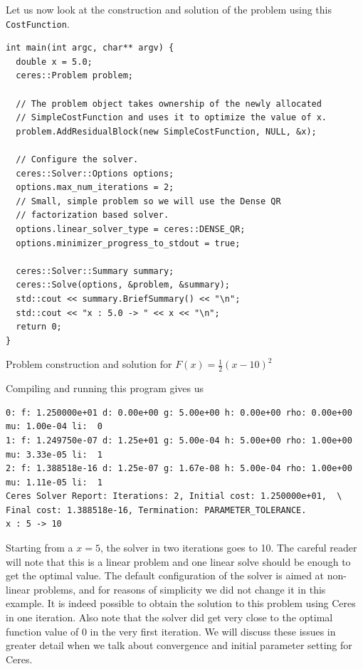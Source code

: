 Let us now look at the construction and solution of the problem using this \texttt{CostFunction}.
\begin{listing}[H]
\begin{verbatim}
int main(int argc, char** argv) {
  double x = 5.0;
  ceres::Problem problem;

  // The problem object takes ownership of the newly allocated
  // SimpleCostFunction and uses it to optimize the value of x.
  problem.AddResidualBlock(new SimpleCostFunction, NULL, &x);

  // Configure the solver.
  ceres::Solver::Options options;
  options.max_num_iterations = 2;
  // Small, simple problem so we will use the Dense QR
  // factorization based solver.
  options.linear_solver_type = ceres::DENSE_QR;
  options.minimizer_progress_to_stdout = true;

  ceres::Solver::Summary summary;
  ceres::Solve(options, &problem, &summary);
  std::cout << summary.BriefSummary() << "\n";
  std::cout << "x : 5.0 -> " << x << "\n";
  return 0;
}
\end{verbatim}
\caption{Problem construction and solution for $F(x) = \frac{1}{2}(x-10)^2$}
\end{listing}

Compiling and running this program gives us
\begin{verbatim}
0: f: 1.250000e+01 d: 0.00e+00 g: 5.00e+00 h: 0.00e+00 rho: 0.00e+00 mu: 1.00e-04 li:  0
1: f: 1.249750e-07 d: 1.25e+01 g: 5.00e-04 h: 5.00e+00 rho: 1.00e+00 mu: 3.33e-05 li:  1
2: f: 1.388518e-16 d: 1.25e-07 g: 1.67e-08 h: 5.00e-04 rho: 1.00e+00 mu: 1.11e-05 li:  1
Ceres Solver Report: Iterations: 2, Initial cost: 1.250000e+01,  \
Final cost: 1.388518e-16, Termination: PARAMETER_TOLERANCE.
x : 5 -> 10
\end{verbatim}

Starting from a $x=5$, the solver in two iterations goes to 10. The careful reader will note that this is a linear problem and one linear solve should be enough to get the optimal value.  The default configuration of the solver is aimed at non-linear problems, and for reasons of simplicity we did not change it in this example. It is indeed possible to obtain the solution to this problem using Ceres in one iteration. Also note that the solver did get very close to the optimal function value of 0 in the very first iteration. We will discuss these issues in greater detail when we talk about convergence and initial parameter setting for Ceres.

